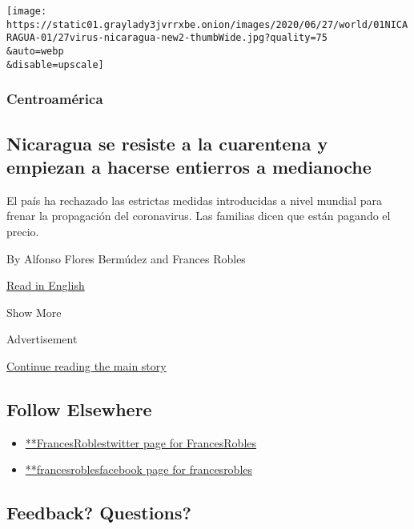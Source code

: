 \begin{enumerate}
  \texttt{[image: https://static01.graylady3jvrrxbe.onion/images/2020/06/27/world/01NICARAGUA-01/27virus-nicaragua-new2-thumbWide.jpg?quality=75\\\&auto=webp\\\&disable=upscale]}

  \hypertarget{centroamuxe9rica-1}{%
  \subsubsection{Centroamérica}\label{centroamuxe9rica-1}}

  \hypertarget{nicaragua-se-resiste-a-la-cuarentena-y-empiezan-a-hacerse-entierros-a-medianoche}{%
  \subsection{Nicaragua se resiste a la cuarentena y empiezan a hacerse
  entierros a
  medianoche}\label{nicaragua-se-resiste-a-la-cuarentena-y-empiezan-a-hacerse-entierros-a-medianoche}}

  El país ha rechazado las estrictas medidas introducidas a nivel
  mundial para frenar la propagación del coronavirus. Las familias dicen
  que están pagando el precio.

  By Alfonso Flores Bermúdez and Frances Robles

  \href{https://www.nytimes3xbfgragh.onion/2020/05/31/world/americas/coronavirus-nicaragua-burials.html}{Read
  in English}
\end{enumerate}

Show More

Advertisement

\protect\hyperlink{after-mid2}{Continue reading the main story}

\hypertarget{follow-elsewhere}{%
\subsection{Follow Elsewhere}\label{follow-elsewhere}}

\begin{itemize}
\tightlist
\item
  \href{https://twitter.com/FrancesRobles}{**FrancesRoblestwitter page
  for FrancesRobles}
\item
  \href{https://www.facebookcorewwwi.onion/francesrobles}{**francesroblesfacebook
  page for francesrobles}
\end{itemize}

\hypertarget{feedback-questions}{%
\subsection{Feedback? Questions?}\label{feedback-questions}}

